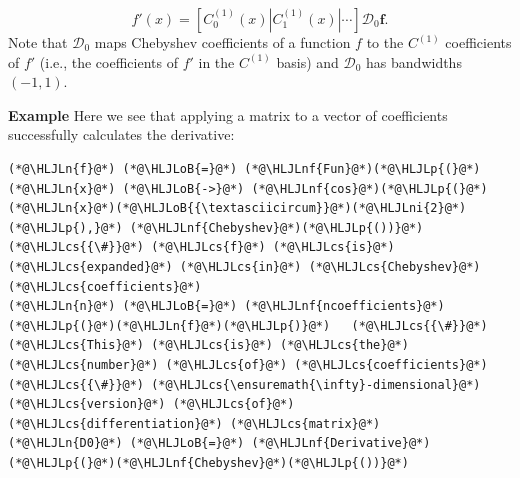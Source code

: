 \documentclass[12pt,a4paper]{article}
\newcommand{\HLJLn}[1]{#1}
\newcommand{\HLJLnf}[1]{\textcolor[RGB]{66,102,213}{#1}}
\newcommand{\HLJLni}[1]{\textcolor[RGB]{59,151,46}{#1}}
\newcommand{\HLJLoB}[1]{\textcolor[RGB]{102,102,102}{\textbf{#1}}}
\newcommand{\HLJLp}[1]{#1}
\newcommand{\HLJLcs}[1]{\textcolor[RGB]{153,153,119}{\textit{#1}}}
\begin{document}
\[
f'(x) = \left[C_0^{(1)}(x) | C_1^{(1)}(x) | \cdots \right]\mathcal{D}_0\mathbf{f}.
\]
Note that $\mathcal{D}_0$ maps Chebyshev coefficients of a function $f$ to the $C^{(1)}$ coefficients of $f'$ (i.e., the coefficients of $f'$ in the $C^{(1)}$ basis) and $\mathcal{D}_0$ has bandwidths $(-1, 1)$.

\textbf{Example} Here we see that applying a matrix to a vector of coefficients successfully calculates the derivative:


\begin{lstlisting}
(*@\HLJLn{f}@*) (*@\HLJLoB{=}@*) (*@\HLJLnf{Fun}@*)(*@\HLJLp{(}@*)(*@\HLJLn{x}@*) (*@\HLJLoB{->}@*) (*@\HLJLnf{cos}@*)(*@\HLJLp{(}@*)(*@\HLJLn{x}@*)(*@\HLJLoB{{\textasciicircum}}@*)(*@\HLJLni{2}@*)(*@\HLJLp{),}@*) (*@\HLJLnf{Chebyshev}@*)(*@\HLJLp{())}@*)   (*@\HLJLcs{{\#}}@*) (*@\HLJLcs{f}@*) (*@\HLJLcs{is}@*) (*@\HLJLcs{expanded}@*) (*@\HLJLcs{in}@*) (*@\HLJLcs{Chebyshev}@*) (*@\HLJLcs{coefficients}@*)
(*@\HLJLn{n}@*) (*@\HLJLoB{=}@*) (*@\HLJLnf{ncoefficients}@*)(*@\HLJLp{(}@*)(*@\HLJLn{f}@*)(*@\HLJLp{)}@*)   (*@\HLJLcs{{\#}}@*) (*@\HLJLcs{This}@*) (*@\HLJLcs{is}@*) (*@\HLJLcs{the}@*) (*@\HLJLcs{number}@*) (*@\HLJLcs{of}@*) (*@\HLJLcs{coefficients}@*)
(*@\HLJLcs{{\#}}@*) (*@\HLJLcs{\ensuremath{\infty}-dimensional}@*) (*@\HLJLcs{version}@*) (*@\HLJLcs{of}@*) (*@\HLJLcs{differentiation}@*) (*@\HLJLcs{matrix}@*)
(*@\HLJLn{D0}@*) (*@\HLJLoB{=}@*) (*@\HLJLnf{Derivative}@*)(*@\HLJLp{(}@*)(*@\HLJLnf{Chebyshev}@*)(*@\HLJLp{())}@*)
\end{lstlisting}
\end{document}
